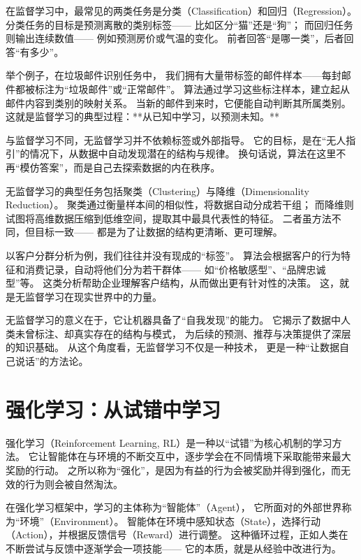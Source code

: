 在监督学习中，最常见的两类任务是分类（Classification）和回归（Regression）。  
分类任务的目标是预测离散的类别标签——  
比如区分“猫”还是“狗”；  
而回归任务则输出连续数值——  
例如预测房价或气温的变化。  
前者回答“是哪一类”，后者回答“有多少”。



举个例子，在垃圾邮件识别任务中，  
我们拥有大量带标签的邮件样本——每封邮件都被标注为“垃圾邮件”或“正常邮件”。  
算法通过学习这些标注样本，建立起从邮件内容到类别的映射关系。  
当新的邮件到来时，它便能自动判断其所属类别。  
这就是监督学习的典型过程：**从已知中学习，以预测未知。**



与监督学习不同，无监督学习并不依赖标签或外部指导。  
它的目标，是在“无人指引”的情况下，从数据中自动发现潜在的结构与规律。  
换句话说，算法在这里不再“模仿答案”，而是自己去探索数据的内在秩序。



无监督学习的典型任务包括聚类（Clustering）与降维（Dimensionality Reduction）。  
聚类通过衡量样本间的相似性，将数据自动分成若干组；  
而降维则试图将高维数据压缩到低维空间，提取其中最具代表性的特征。  
二者虽方法不同，但目标一致——  
都是为了让数据的结构更清晰、更可理解。



以客户分群分析为例，我们往往并没有现成的“标签”。  
算法会根据客户的行为特征和消费记录，自动将他们分为若干群体——  
如“价格敏感型”、“品牌忠诚型”等。  
这类分析帮助企业理解客户结构，从而做出更有针对性的决策。  
这，就是无监督学习在现实世界中的力量。



无监督学习的意义在于，它让机器具备了“自我发现”的能力。  
它揭示了数据中人类未曾标注、却真实存在的结构与模式，  
为后续的预测、推荐与决策提供了深层的知识基础。  
从这个角度看，无监督学习不仅是一种技术，  
更是一种“让数据自己说话”的方法论。

\section{强化学习：从试错中学习}

强化学习（Reinforcement Learning, RL）是一种以“试错”为核心机制的学习方法。  
它让智能体在与环境的不断交互中，逐步学会在不同情境下采取能带来最大奖励的行动。  
之所以称为“强化”，是因为有益的行为会被奖励并得到强化，而无效的行为则会被自然淘汰。



在强化学习框架中，学习的主体称为“智能体”（Agent），  
它所面对的外部世界称为“环境”（Environment）。  
智能体在环境中感知状态（State），选择行动（Action），并根据反馈信号（Reward）进行调整。  
这种循环过程，正如人类在不断尝试与反馈中逐渐学会一项技能——  
它的本质，就是从经验中改进行为。




